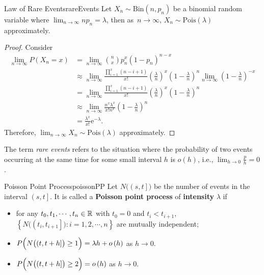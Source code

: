 \documentclass[math, code]{amznotes}
\theoremstyle{remark}
\newcommand{\e}{\mathrm{e}}
\begin{document}
\begin{thmbox}{Law of Rare Events}{rareEvents}
    Let $X_n \sim \mathrm{Bin}\left(n, p_n\right)$ be a binomial random variable where $\lim_{n \to \infty}np_n = \lambda$, then as~$n \to \infty$, $X_n \sim \mathrm{Pois}\left(\lambda\right)$ approximately.
    \tcblower
    \begin{proof}
        Consider 
        \begin{align*}
            \lim_{n \to \infty}P\left(X_n = x\right) & = \lim_{n \to \infty}\binom{n}{x}p_n^x\left(1 - p_n\right)^{n - x} \\
            & \approx \lim_{n \to \infty}\frac{\prod_{i = 1}^{x}\left(n - i + 1\right)}{x!}\left(\frac{\lambda}{n}\right)^x\left(1 - \frac{\lambda}{n}\right)^n\lim_{n \to \infty}\left(1 - \frac{\lambda}{n}\right)^{-x} \\
            & = \lim_{n \to \infty}\frac{\prod_{i = 1}^{x}\left(n - i + 1\right)}{x!}\left(\frac{\lambda}{n}\right)^x\left(1 - \frac{\lambda}{n}\right)^n \\
            & \approx \lim_{n \to \infty}\frac{n^x\lambda^x}{x!n^x}\left(1 - \frac{\lambda}{n}\right)^n \\
            & = \frac{\lambda^x}{x!}\e^{-\lambda}.
        \end{align*}
        Therefore, $\lim_{n \to \infty}X_n \sim \mathrm{Pois}\left(\lambda\right)$ approximately.
    \end{proof}
\end{thmbox}
The term \textit{rare events} refers to the situation where the probability of two events occurring at the same time for some small interval $h$ is $o\left(h\right)$, i.e., $\lim_{h \to 0}\frac{p}{h} = 0$.
\begin{dfnbox}{Poisson Point Process}{poissonPP}
    Let $N\bigl(\left(s, t\right]\bigr)$ be the number of events in the interval $\left(s, t\right]$. It is called a {\color{red} \textbf{Poisson point process}} of {\color{red} \textbf{intensity}} $\lambda$ if 
    \begin{itemize}
        \item for any $t_0, t_1, \cdots, t_n \in \mathbb{R}$ with $t_0 = 0$ and $t_i < t_{i + 1}$, $\left\{N\bigl(\left(t_i, t_{i + 1}\right]\bigr) \colon i = 1, 2, \cdots, n\right\}$ are mutually independent;
        \item $P\Bigl(N\bigl(\left(t, t + h\right]\bigr) \geq 1\Bigr) = \lambda h + o\left(h\right)$ as $h \to 0$.
        \item $P\Bigl(N\bigl(\left(t, t + h\right]\bigr) \geq 2\Bigr) = o\left(h\right)$ as $h \to 0$.
    \end{itemize}
\end{dfnbox}
\end{document}
